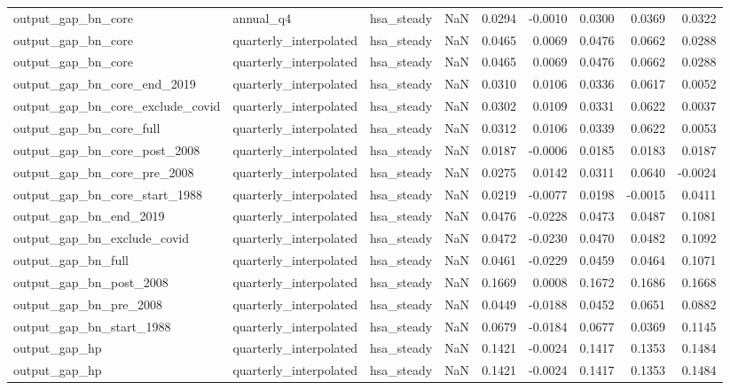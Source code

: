 \begin{tabular}{lllrrrrrr}
output\_gap\_bn\_core & annual\_q4 & hsa\_steady & NaN & 0.0294 & -0.0010 & 0.0300 & 0.0369 & 0.0322 \\
output\_gap\_bn\_core & quarterly\_interpolated & hsa\_steady & NaN & 0.0465 & 0.0069 & 0.0476 & 0.0662 & 0.0288 \\
output\_gap\_bn\_core & quarterly\_interpolated & hsa\_steady & NaN & 0.0465 & 0.0069 & 0.0476 & 0.0662 & 0.0288 \\
output\_gap\_bn\_core\_end\_2019 & quarterly\_interpolated & hsa\_steady & NaN & 0.0310 & 0.0106 & 0.0336 & 0.0617 & 0.0052 \\
output\_gap\_bn\_core\_exclude\_covid & quarterly\_interpolated & hsa\_steady & NaN & 0.0302 & 0.0109 & 0.0331 & 0.0622 & 0.0037 \\
output\_gap\_bn\_core\_full & quarterly\_interpolated & hsa\_steady & NaN & 0.0312 & 0.0106 & 0.0339 & 0.0622 & 0.0053 \\
output\_gap\_bn\_core\_post\_2008 & quarterly\_interpolated & hsa\_steady & NaN & 0.0187 & -0.0006 & 0.0185 & 0.0183 & 0.0187 \\
output\_gap\_bn\_core\_pre\_2008 & quarterly\_interpolated & hsa\_steady & NaN & 0.0275 & 0.0142 & 0.0311 & 0.0640 & -0.0024 \\
output\_gap\_bn\_core\_start\_1988 & quarterly\_interpolated & hsa\_steady & NaN & 0.0219 & -0.0077 & 0.0198 & -0.0015 & 0.0411 \\
output\_gap\_bn\_end\_2019 & quarterly\_interpolated & hsa\_steady & NaN & 0.0476 & -0.0228 & 0.0473 & 0.0487 & 0.1081 \\
output\_gap\_bn\_exclude\_covid & quarterly\_interpolated & hsa\_steady & NaN & 0.0472 & -0.0230 & 0.0470 & 0.0482 & 0.1092 \\
output\_gap\_bn\_full & quarterly\_interpolated & hsa\_steady & NaN & 0.0461 & -0.0229 & 0.0459 & 0.0464 & 0.1071 \\
output\_gap\_bn\_post\_2008 & quarterly\_interpolated & hsa\_steady & NaN & 0.1669 & 0.0008 & 0.1672 & 0.1686 & 0.1668 \\
output\_gap\_bn\_pre\_2008 & quarterly\_interpolated & hsa\_steady & NaN & 0.0449 & -0.0188 & 0.0452 & 0.0651 & 0.0882 \\
output\_gap\_bn\_start\_1988 & quarterly\_interpolated & hsa\_steady & NaN & 0.0679 & -0.0184 & 0.0677 & 0.0369 & 0.1145 \\
output\_gap\_hp & quarterly\_interpolated & hsa\_steady & NaN & 0.1421 & -0.0024 & 0.1417 & 0.1353 & 0.1484 \\
output\_gap\_hp & quarterly\_interpolated & hsa\_steady & NaN & 0.1421 & -0.0024 & 0.1417 & 0.1353 & 0.1484 \\

\end{tabular}

